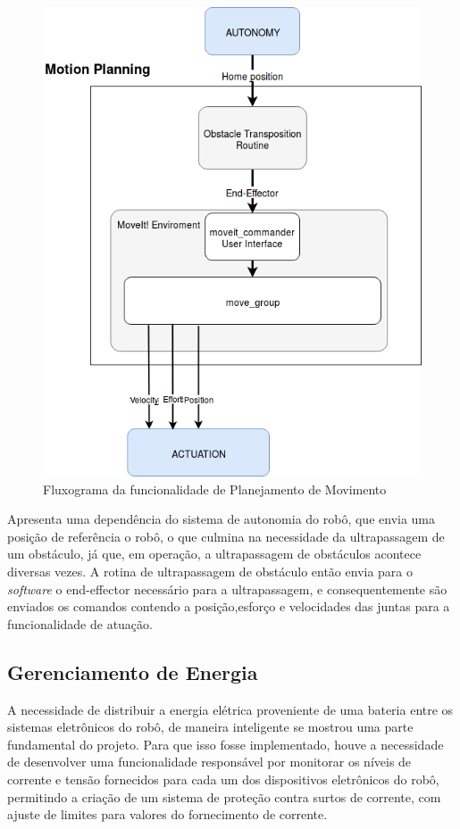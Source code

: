 \begin{figure}[H]
	\centering
	\includegraphics[scale=0.4]{Figures/motion_plan_func.png}
	\caption{Fluxograma da funcionalidade de Planejamento de Movimento}
	\label{fig:fluxo_motion}
\end{figure}

		
Apresenta uma dependência do sistema de autonomia do robô, que envia uma posição de referência o robô, o que culmina na necessidade da ultrapassagem de um obstáculo, já que, em operação, a ultrapassagem de obstáculos acontece diversas vezes. A rotina de ultrapassagem de obstáculo então envia para o \textit{software} o end-effector necessário para a ultrapassagem, e consequentemente são enviados os comandos contendo  a posição,esforço e velocidades das juntas para a funcionalidade de atuação.

\subsection{Gerenciamento de Energia}\label{sec:geren_ener} 
A necessidade de distribuir a energia elétrica proveniente de uma bateria entre os sistemas eletrônicos do robô, de maneira inteligente se mostrou uma parte fundamental do projeto. Para que isso fosse implementado, houve a necessidade de desenvolver uma funcionalidade responsável por monitorar os níveis de corrente e tensão fornecidos para cada um dos dispositivos eletrônicos do robô, permitindo a criação de um sistema de proteção contra surtos de corrente, com ajuste de limites para valores do fornecimento de corrente.

